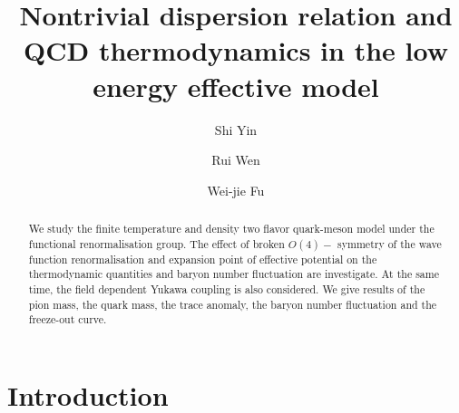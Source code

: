 \documentclass[%
reprint,
superscriptaddress,
showpacs,preprintnumbers,
 amsmath,amssymb,
 aps,
prd,
]{revtex4-1}
\begin{document}
\preprint{}

\title{Nontrivial dispersion relation and QCD thermodynamics in the low energy effective model
}

\author{Shi Yin}

\author{Rui Wen}

\author{Wei-jie Fu}


\begin{abstract}
We study the finite temperature and density two flavor quark-meson model under the functional renormalisation group. The effect of broken $O(4)-$
symmetry of the wave function  renormalisation and expansion point of effective potential on the thermodynamic quantities and baryon number fluctuation 
are investigate. At the same time, the field dependent Yukawa coupling is also considered. We give results of the pion mass, the quark mass, the trace 
anomaly, the baryon number fluctuation and the freeze-out curve.
\end{abstract}

\maketitle



\section{Introduction}
\end{document}
